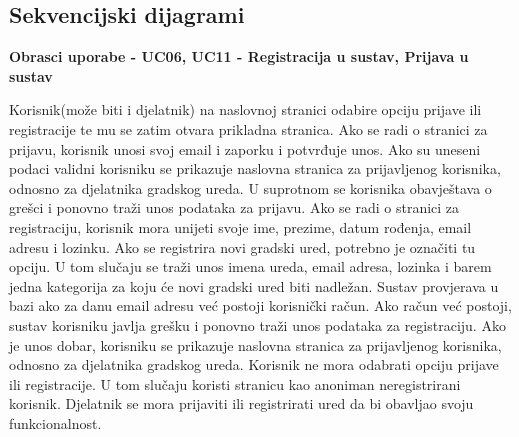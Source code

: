 				\eject		
				
			\subsection{Sekvencijski dijagrami}
				
				\textbf{Obrasci uporabe - UC06, UC11 - Registracija u sustav, Prijava u sustav}
				
				Korisnik(može biti i djelatnik) na naslovnoj stranici odabire opciju prijave ili registracije te mu se zatim otvara prikladna stranica. Ako se radi o stranici za prijavu, korisnik unosi svoj email i zaporku i potvrđuje unos. Ako su uneseni podaci validni korisniku se prikazuje naslovna stranica za prijavljenog korisnika, odnosno za djelatnika gradskog ureda. U suprotnom se korisnika obavještava o grešci i ponovno traži unos podataka za prijavu. Ako se radi o stranici za registraciju, korisnik mora unijeti svoje ime, prezime, datum rođenja, email adresu i lozinku. Ako se registrira novi gradski ured, potrebno je označiti tu opciju. U tom slučaju se traži unos imena ureda, email adresa, lozinka i barem jedna kategorija za koju će novi gradski ured biti nadležan. Sustav provjerava u bazi ako za danu email adresu već postoji korisnički račun. Ako račun već postoji, sustav korisniku javlja grešku i ponovno traži unos podataka za registraciju. Ako je unos dobar, korisniku se prikazuje naslovna stranica za prijavljenog korisnika, odnosno za djelatnika gradskog ureda. Korisnik ne mora odabrati opciju prijave ili registracije. U tom slučaju koristi stranicu kao anoniman neregistrirani korisnik. Djelatnik se mora prijaviti ili registrirati ured da bi obavljao svoju funkcionalnost.
				
